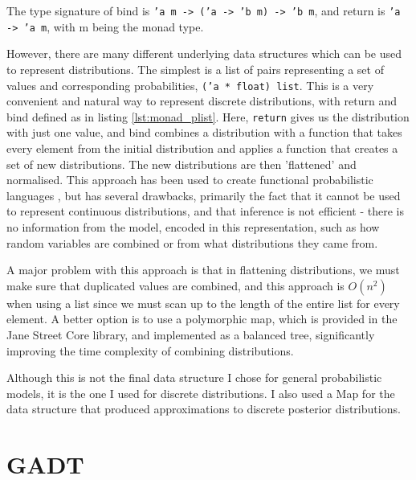 The type signature of bind is \texttt{'a m -> ('a -> 'b m) -> 'b m}, and return is \texttt{'a -> 'a m}, with m being the monad type.


However, there are many different underlying data structures which can be used to represent distributions. The simplest is a list of pairs representing a set of values and corresponding probabilities, \texttt{('a * float) list}. This is a very convenient and natural way to represent discrete distributions, with return and bind defined as in listing \ref{lst:monad_plist}. Here, \texttt{return} gives us the distribution with just one value, and bind combines a distribution with a function that takes every element from the initial distribution and applies a function that creates a set of new distributions. The new distributions are then 'flattened' and normalised. This approach has been used to create functional probabilistic languages \cite{erwig}, but has several drawbacks, primarily the fact that it cannot be used to represent continuous distributions, and that inference is not efficient - there is no information from the model, encoded in this representation, such as how random variables are combined or from what distributions they came from.



A major problem with this approach is that in flattening distributions, we must make sure that duplicated values are combined, and this approach is $O(n^2)$ when using a list since we must scan up to the length of the entire list for every element. A better option is to use a polymorphic map, which is provided in the Jane Street Core library, and implemented as a balanced tree, significantly improving the time complexity of combining distributions.



Although this is not the final data structure I chose for general probabilistic models, it is the one I used for discrete distributions. I also used a Map for the data structure that produced approximations to discrete posterior distributions.

\section{GADT}

